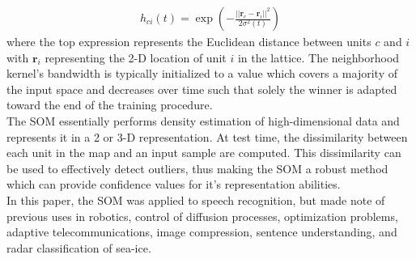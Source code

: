 \documentclass[]{article}
\begin{document}
	\begin{align*}
		 h_{ci}(t) = \exp{\left( -\frac{||\bm{r}_{c} - \bm{r}_i ||^{2}}{2 \sigma^{2}(t)} \right)}
	\end{align*}
	\noindent
	where the top expression represents the Euclidean distance between units $c$ and $i$ with $\bm{r}_{i}$ representing the 2-D location of unit $i$ in the lattice.  The neighborhood kernel's bandwidth is typically initialized to a value which covers a majority of the input space and decreases over time such that solely the winner is adapted toward the end of the training procedure. \\
	
	\noindent
	The SOM essentially performs density estimation of high-dimensional data and represents it in a 2 or 3-D representation.  At test time, the dissimilarity between each unit in the map and an input sample are computed.  This dissimilarity can be used to effectively detect outliers, thus making the SOM a robust method which can provide confidence values for it's representation abilities. \\
	
	In this paper, the SOM was applied to speech recognition, but made note of previous uses in robotics, control of diffusion processes, optimization problems, adaptive telecommunications, image compression, sentence understanding, and radar classification of sea-ice. \\
	
\end{document}
